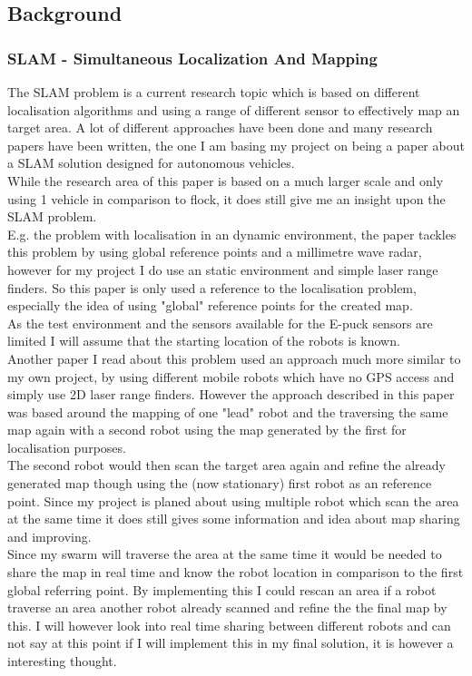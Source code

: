 \documentclass[10pt,a4paper]{article}
\begin{document}
\begin{flushleft}
\subsection{Background}
\subsubsection{SLAM - Simultaneous Localization And Mapping}
The SLAM problem is a current research topic which is based on different localisation algorithms and using a range of different sensor to effectively map an target area. A lot of different approaches have been done and many research papers have been written, the one I am basing my project on being a paper about a SLAM solution designed for autonomous vehicles\cite{Dissanayake2001Solution}.\\
While the research area of this paper is based on a much larger scale and only using 1 vehicle in comparison to flock, it does still give me an insight upon the SLAM problem.\\
E.g. the problem with localisation in an dynamic environment, the paper tackles this problem by using global reference points and a millimetre wave radar, however for my project I do use an static environment and simple laser range finders. So this paper is only used a reference to the localisation problem, especially the idea of using "global" reference points for the created map.\\
As the test environment and the sensors available for the E-puck sensors are limited I will assume that the starting location of the robots is known.\\[3ex]

Another paper I read about this problem used an approach much more similar to my own project, by using different mobile robots which have no GPS access and simply use 2D laser range finders. However the approach described in this paper was based around the mapping of one "lead" robot and the traversing the same map again with a second robot using the map generated by the first for localisation purposes.\\
The second robot would then scan the target area again and refine the already generated map though using the (now stationary) first robot as an reference point. Since my project is planed about using multiple robot which scan the area at the same time it does still gives some information and idea about map sharing and improving. \\
Since my swarm will traverse the area at the same time it would be needed to share the map in real time and know the robot location in comparison to the first global referring point.  By implementing this I could rescan an area if a robot traverse an area another robot already scanned and refine the the final map by this. I will however look into real time sharing between different robots and can not say at this point if I will implement this in my final solution, it is however a interesting thought.\\[3ex]


\end{flushleft}
\end{document}
